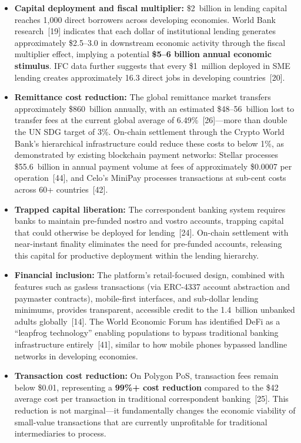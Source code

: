 \documentclass[12pt,a4paper]{report}
\begin{document}
\begin{itemize}[noitemsep]
\item \textbf{Capital deployment and fiscal multiplier:} \$2~billion in lending capital reaches 1,000 direct borrowers across developing economies. World Bank research~[19] indicates that each dollar of institutional lending generates approximately \$2.5--3.0 in downstream economic activity through the fiscal multiplier effect, implying a potential \textbf{\$5--6 billion annual economic stimulus}. IFC data further suggests that every \$1~million deployed in SME lending creates approximately 16.3 direct jobs in developing countries~[20].

\item \textbf{Remittance cost reduction:} The global remittance market transfers approximately \$860~billion annually, with an estimated \$48--56~billion lost to transfer fees at the current global average of 6.49\%~[26]---more than double the UN SDG target of 3\%. On-chain settlement through the Crypto World Bank's hierarchical infrastructure could reduce these costs to below 1\%, as demonstrated by existing blockchain payment networks: Stellar processes \$55.6~billion in annual payment volume at fees of approximately \$0.0007 per operation~[44], and Celo's MiniPay processes transactions at sub-cent costs across 60+ countries~[42].

\item \textbf{Trapped capital liberation:} The correspondent banking system requires banks to maintain pre-funded nostro and vostro accounts, trapping capital that could otherwise be deployed for lending~[24]. On-chain settlement with near-instant finality eliminates the need for pre-funded accounts, releasing this capital for productive deployment within the lending hierarchy.

\item \textbf{Financial inclusion:} The platform's retail-focused design, combined with features such as gasless transactions (via ERC-4337 account abstraction and paymaster contracts), mobile-first interfaces, and sub-dollar lending minimums, provides transparent, accessible credit to the 1.4~billion unbanked adults globally~[14]. The World Economic Forum has identified DeFi as a ``leapfrog technology'' enabling populations to bypass traditional banking infrastructure entirely~[41], similar to how mobile phones bypassed landline networks in developing economies.

\item \textbf{Transaction cost reduction:} On Polygon PoS, transaction fees remain below \$0.01, representing a \textbf{99\%+ cost reduction} compared to the \$42 average cost per transaction in traditional correspondent banking~[25]. This reduction is not marginal---it fundamentally changes the economic viability of small-value transactions that are currently unprofitable for traditional intermediaries to process.


\end{itemize}
\end{document}
